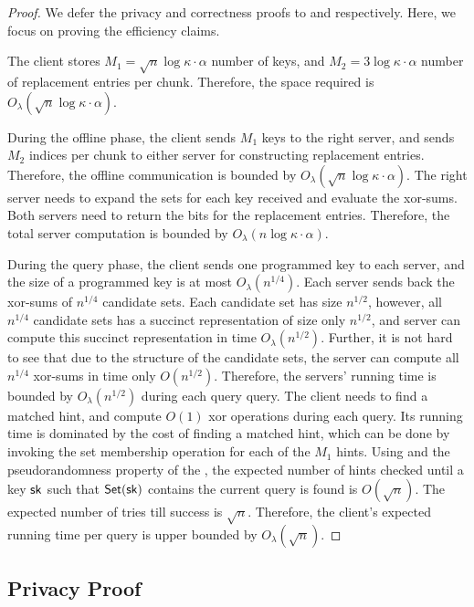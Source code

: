 \begin{proof}
We defer the privacy and correctness proofs to 
and 
respectively. Here, we focus on proving the efficiency claims.

The client stores $M_1 = \sqrt{n} \log \kappa \cdot \alpha$ number
of \ppps keys, and $M_2 = 3 \log \kappa \cdot \alpha$ number
of replacement entries per chunk.
Therefore, the space required is $O_\lambda(\sqrt{n} \log \kappa \cdot \alpha)$.

During the offline phase, the client
sends $M_1$ \ppps  
keys to the right server, and sends $M_2$ indices per chunk
to either server for constructing replacement entries.
Therefore, the offline communication is bounded
by $O_\lambda(\sqrt{n} \log \kappa \cdot \alpha)$. 
The right server needs to expand the sets for each \ppps key received
and evaluate the xor-sums.  
Both servers need to return the bits for the replacement entries.
Therefore, the total server computation is bounded
by $O_\lambda(n \log\kappa \cdot \alpha)$.

During the query phase, the client
sends one programmed \ppps key to each server,
and the size of a programmed key is at most $O_\lambda(n^{1/4})$.
Each server sends back the xor-sums of $n^{1/4}$
candidate sets.
Each candidate set has size $n^{1/2}$, however, all
$n^{1/4}$ candidate sets has a succinct representation
of size only $n^{1/2}$, 
and server can compute this succinct representation
in time $O_\lambda(n^{1/2})$.
Further, it is not hard to see that due to the structure
of the candidate sets, the server can compute
all $n^{1/4}$ xor-sums in time only $O(n^{1/2})$.
Therefore, the servers' running time is
bounded by $O_\lambda(n^{1/2})$
during each query query.
The client needs to find a matched hint, and compute
$O(1)$ xor operations during each query.
Its running time is 
dominated by the cost of finding a matched hint, which
can be done by invoking the set membership operation
for each of the $M_1$ hints.
Using 
and the pseudorandomness property of the \ppps, the expected
number of hints checked until a key $\mathsf{sk}$ such that $\mathsf{Set}(\mathsf{sk})$ contains the current query is found is $O(\sqrt{n})$.
The expected number of tries till success is $\sqrt{n}$.
Therefore, the client's expected running time per query
is upper bounded by $O_\lambda(\sqrt{n})$.
\end{proof}



\subsection{Privacy Proof}
\label{sec:2server-priv}

